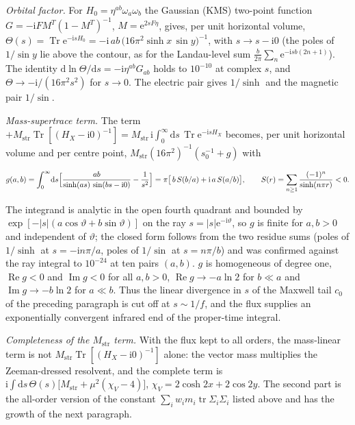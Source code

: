 \emph{Orbital factor.} For \(H_0=\eta^{ab}\omega_a\omega_b\) the Gaussian (KMS) two-point function \(G=-\mathrm iFM^{T}(1-M^{T})^{-1}\), \(M=\mathrm e^{2sF\eta}\), gives, per unit horizontal volume, \(\Theta(s)=\operatorname{Tr}\mathrm e^{-\mathrm isH_0}=-\mathrm i\,ab\,\bigl(16\pi^2\sinh x\,\sin y\bigr)^{-1}\), with \(s\to s-\mathrm i0\) (the poles of \(1/\sin y\) lie above the contour, as for the Landau-level sum \(\tfrac{b}{2\pi}\sum_n\mathrm e^{-\mathrm isb(2n+1)}\)). The identity \(\mathrm d\ln\Theta/\mathrm ds=-\mathrm i\eta^{ab}G_{ab}\) holds to \(10^{-10}\) at complex \(s\), and \(\Theta\to-\mathrm i/(16\pi^2s^2)\) for \(s\to0\). The electric pair gives \(1/\sinh\) and the magnetic pair \(1/\sin\).



\emph{Mass-supertrace term.} The term \(+M_{\mathrm{str}}\operatorname{Tr}[(H_X-\mathrm i0)^{-1}]=M_{\mathrm{str}}\,\mathrm i\!\int_0^\infty\!\mathrm ds\,\operatorname{Tr}\mathrm e^{-\mathrm isH_X}\) becomes, per unit horizontal volume and per centre point, \(M_{\mathrm{str}}(16\pi^2)^{-1}(s_0^{-1}+g)\) with

\[

g(a,b)=\int_0^\infty\!\mathrm ds\Bigl[\frac{ab}{\sinh(as)\,\sin(bs-\mathrm i0)}-\frac1{s^2}\Bigr]=\pi\bigl[\,b\,S(b/a)+\mathrm i\,a\,S(a/b)\bigr],\qquad S(r)=\sum_{n\ge1}\frac{(-1)^n}{\sinh(n\pi r)}<0 .

\]

The integrand is analytic in the open fourth quadrant and bounded by \(\exp[-|s|(a\cos\vartheta+b\sin\vartheta)]\) on the ray \(s=|s|\mathrm e^{-\mathrm i\vartheta}\), so \(g\) is finite for \(a,b>0\) and independent of \(\vartheta\); the closed form follows from the two residue sums (poles of \(1/\sinh\) at \(s=-\mathrm in\pi/a\), poles of \(1/\sin\) at \(s=n\pi/b\)) and was confirmed against the ray integral to \(10^{-24}\) at ten pairs \((a,b)\). \(g\) is homogeneous of degree one, \(\operatorname{Re}g<0\) and \(\operatorname{Im}g<0\) for all \(a,b>0\), \(\operatorname{Re}g\to-a\ln2\) for \(b\ll a\) and \(\operatorname{Im}g\to-b\ln2\) for \(a\ll b\). Thus the linear divergence in \(s\) of the Maxwell tail \(c_0\) of the preceding paragraph is cut off at \(s\sim1/f\), and the flux supplies an exponentially convergent infrared end of the proper-time integral.



\emph{Completeness of the \(M_{\mathrm{str}}\) term.} With the flux kept to all orders, the mass-linear term is not \(M_{\mathrm{str}}\operatorname{Tr}[(H_X-\mathrm i0)^{-1}]\) alone: the vector mass multiplies the Zeeman-dressed resolvent, and the complete term is \(\mathrm i\!\int\!\mathrm ds\,\Theta(s)\bigl[M_{\mathrm{str}}+\mu^2(\chi_V-4)\bigr]\), \(\chi_V=2\cosh2x+2\cos2y\). The second part is the all-order version of the constant \(\sum_iw_im_i\operatorname{tr}\Sigma_i\Sigma_i\) listed above and has the growth of the next paragraph.



